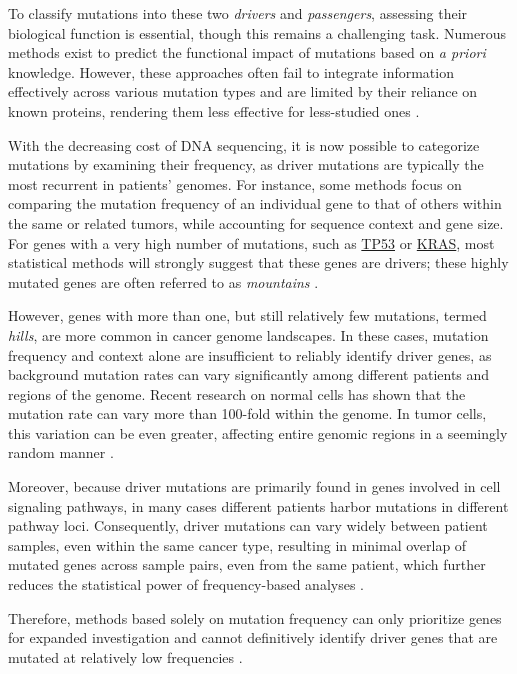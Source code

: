 To classify mutations into these two \textit{drivers} and \textit{passengers}, assessing their biological function is essential, though this remains a challenging task. Numerous methods exist to predict the functional impact of mutations based on \textit{a priori} knowledge. However, these approaches often fail to integrate information effectively across various mutation types and are limited by their reliance on known proteins, rendering them less effective for less-studied ones \cite{multi-dendrix}.

With the decreasing cost of DNA sequencing, it is now possible to categorize mutations by examining their frequency, as driver mutations are typically the most recurrent in patients' genomes. For instance, some methods focus on comparing the mutation frequency of an individual gene to that of others within the same or related tumors, while accounting for sequence context and gene size. For genes with a very high number of mutations, such as \href{https://en.wikipedia.org/wiki/P53}{TP53} or \href{https://en.wikipedia.org/wiki/KRAS}{KRAS}, most statistical methods will strongly suggest that these genes are drivers; these highly mutated genes are often referred to as \textit{mountains} \cite{multi-dendrix, vogelstein2013}.

However, genes with more than one, but still relatively few mutations, termed \textit{hills}, are more common in cancer genome landscapes. In these cases, mutation frequency and context alone are insufficient to reliably identify driver genes, as background mutation rates can vary significantly among different patients and regions of the genome. Recent research on normal cells has shown that the mutation rate can vary more than 100-fold within the genome. In tumor cells, this variation can be even greater, affecting entire genomic regions in a seemingly random manner \cite{vogelstein2013}.

Moreover, because driver mutations are primarily found in genes involved in cell signaling pathways, in many cases different patients harbor mutations in different pathway loci. Consequently, driver mutations can vary widely between patient samples, even within the same cancer type, resulting in minimal overlap of mutated genes across sample pairs, even from the same patient, which further reduces the statistical power of frequency-based analyses \cite{multi-dendrix, mdpfinder}.

Therefore, methods based solely on mutation frequency can only prioritize genes for expanded investigation and cannot definitively identify driver genes that are mutated at relatively low frequencies \cite{vogelstein2013}.

